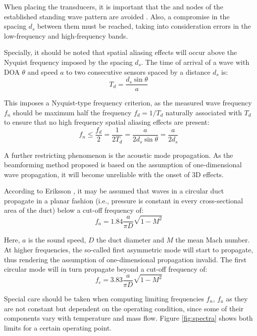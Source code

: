 When placing the transducers, it is important that the  and  nodes of the established standing wave pattern are avoided \cite{dowling1983sound}. Also, a compromise in the spacing $d_s$ between them must be reached, taking into consideration errors in the  low-frequency \cite{aabom1988error} and high-frequency \cite{seybert1988two} bands.

Specially, it should be noted that spatial aliasing effects will occur above the Nyquist frequency imposed by the spacing $d_s$. The time of arrival of a wave with DOA $\theta$ and speed $a$ to two consecutive sensors spaced by a distance $d_s$ is:
\begin{equation}
  T_d = \frac{d_s \sin \theta}{a}
\end{equation}

This imposes a Nyquist-type frequency criterion, as the measured wave frequency $f_n$ should be maximum half the frequency $f_d=1/T_d$ naturally associated with $T_d$ to ensure that no high frequency spatial aliasing effects are present:
\begin{equation}\label{eq:f_nyquist}
  f_n \leq \frac{f_d}{2} = \frac{1}{2T_d}=\frac{a}{2d_s \sin \theta}=\frac{a}{2d_s}
\end{equation}

A further restricting phenomenon is the acoustic mode propagation. As the beamforming method proposed is based on the assumption of one-dimensional wave propagation, it will become unreliable with the onset of 3D effects.

According to Eriksson \cite{eriksson1980higher}, it may be assumed that waves in a circular duct propagate in a planar fashion (i.e., pressure is constant in every cross-sectional area of the duct) below a cut-off frequency of:
\begin{equation}\label{eq:f_modes}
f_a = 1.84 \frac{a}{\pi D}\sqrt{1-M^2}
\end{equation}

Here, $a$ is the sound speed, $D$ the duct diameter and $M$ the mean Mach number. At higher frequencies, the so-called first asymmetric mode will start to propagate, thus rendering the assumption of one-dimensional propagation invalid. The first circular mode will in turn propagate beyond a cut-off frequency of:
\begin{equation}\label{eq:f_modes_circ}
f_c = 3.83 \frac{a}{\pi D}\sqrt{1-M^2}
\end{equation}

Special care should be taken when computing limiting frequencies $f_n$, $f_a$ as they are not constant but dependent on the operating condition, since some of their components vary with temperature and mass flow. Figure \ref{fig:spectra} shows both limits for a certain operating point.

